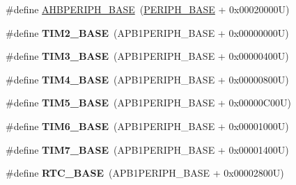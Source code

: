 \begin{DoxyCompactItemize}
\item 
\#define \hyperlink{group___peripheral__memory__map_ga92eb5d49730765d2abd0f5b09548f9f5}{A\-H\-B\-P\-E\-R\-I\-P\-H\-\_\-\-B\-A\-S\-E}~(\hyperlink{group___peripheral__memory__map_ga9171f49478fa86d932f89e78e73b88b0}{P\-E\-R\-I\-P\-H\-\_\-\-B\-A\-S\-E} + 0x00020000\-U)
\item 
\hypertarget{group___peripheral__memory__map_ga00d0fe6ad532ab32f0f81cafca8d3aa5}{\#define {\bfseries T\-I\-M2\-\_\-\-B\-A\-S\-E}~(A\-P\-B1\-P\-E\-R\-I\-P\-H\-\_\-\-B\-A\-S\-E + 0x00000000\-U)}\label{group___peripheral__memory__map_ga00d0fe6ad532ab32f0f81cafca8d3aa5}

\item 
\hypertarget{group___peripheral__memory__map_gaf0c34a518f87e1e505cd2332e989564a}{\#define {\bfseries T\-I\-M3\-\_\-\-B\-A\-S\-E}~(A\-P\-B1\-P\-E\-R\-I\-P\-H\-\_\-\-B\-A\-S\-E + 0x00000400\-U)}\label{group___peripheral__memory__map_gaf0c34a518f87e1e505cd2332e989564a}

\item 
\hypertarget{group___peripheral__memory__map_ga56e2d44b0002f316527b8913866a370d}{\#define {\bfseries T\-I\-M4\-\_\-\-B\-A\-S\-E}~(A\-P\-B1\-P\-E\-R\-I\-P\-H\-\_\-\-B\-A\-S\-E + 0x00000800\-U)}\label{group___peripheral__memory__map_ga56e2d44b0002f316527b8913866a370d}

\item 
\hypertarget{group___peripheral__memory__map_ga3e1671477190d065ba7c944558336d7e}{\#define {\bfseries T\-I\-M5\-\_\-\-B\-A\-S\-E}~(A\-P\-B1\-P\-E\-R\-I\-P\-H\-\_\-\-B\-A\-S\-E + 0x00000\-C00\-U)}\label{group___peripheral__memory__map_ga3e1671477190d065ba7c944558336d7e}

\item 
\hypertarget{group___peripheral__memory__map_ga8268ec947929f192559f28c6bf7d1eac}{\#define {\bfseries T\-I\-M6\-\_\-\-B\-A\-S\-E}~(A\-P\-B1\-P\-E\-R\-I\-P\-H\-\_\-\-B\-A\-S\-E + 0x00001000\-U)}\label{group___peripheral__memory__map_ga8268ec947929f192559f28c6bf7d1eac}

\item 
\hypertarget{group___peripheral__memory__map_ga0ebf54364c6a2be6eb19ded6b18b6387}{\#define {\bfseries T\-I\-M7\-\_\-\-B\-A\-S\-E}~(A\-P\-B1\-P\-E\-R\-I\-P\-H\-\_\-\-B\-A\-S\-E + 0x00001400\-U)}\label{group___peripheral__memory__map_ga0ebf54364c6a2be6eb19ded6b18b6387}

\item 
\hypertarget{group___peripheral__memory__map_ga4265e665d56225412e57a61d87417022}{\#define {\bfseries R\-T\-C\-\_\-\-B\-A\-S\-E}~(A\-P\-B1\-P\-E\-R\-I\-P\-H\-\_\-\-B\-A\-S\-E + 0x00002800\-U)}\label{group___peripheral__memory__map_ga4265e665d56225412e57a61d87417022}


\end{DoxyCompactItemize}
